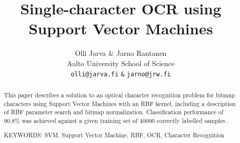 \documentclass{netsec2012}
\begin{document}

\title{Single-character OCR using Support Vector Machines}

\author{Olli Jarva \& Jarno Rantanen \\
        Aalto University School of Science \\
	\texttt{olli@jarva.fi} \texttt{\&} \texttt{jarno@jrw.fi}}
\maketitle


\begin{abstract}

This paper describes a solution to an optical character recognition problem for bitmap characters
using Support Vector Machines with an RBF kernel, including a description of RBF parameter search
and bitmap normalization.  Classification performance of 90.8\% was achieved against a given
training set of 40000 correctly labelled samples \cite{training_set}.

\vspace{3mm}
\noindent KEYWORDS: SVM, Support Vector Machine, RBF, OCR, Character Recognition

\end{abstract}





\end{document}
